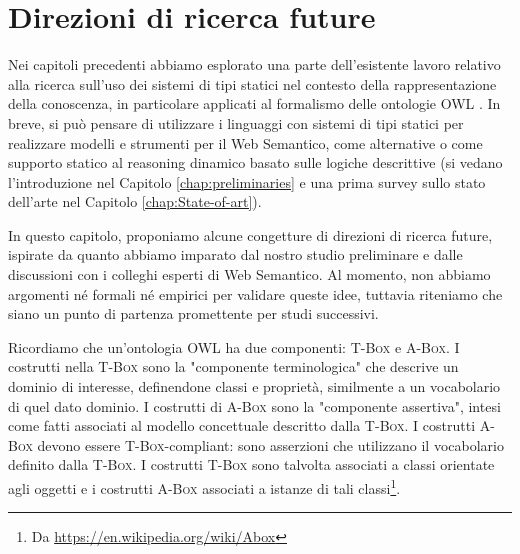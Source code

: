 
\chapter[Direzioni di ricerca future]{Direzioni di ricerca future}
\label{chap:FutureWork}

Nei capitoli precedenti abbiamo esplorato una parte dell'esistente lavoro relativo alla ricerca sull'uso dei sistemi di tipi statici nel contesto della 
rappresentazione della conoscenza, in particolare applicati al formalismo delle ontologie OWL \cite{OWL}. In breve, si può pensare di utilizzare i 
linguaggi con sistemi di tipi statici per realizzare modelli e strumenti per  il Web Semantico, come alternative o come supporto statico al reasoning 
dinamico basato sulle logiche descrittive (si vedano l'introduzione nel Capitolo \ref{chap:preliminaries} e una prima survey sullo stato dell'arte nel Capitolo \ref{chap:State-of-art}).

In questo capitolo, proponiamo alcune congetture di direzioni di ricerca future, ispirate da quanto abbiamo imparato dal nostro studio preliminare e dalle 
discussioni con i colleghi esperti di Web Semantico. Al momento, non abbiamo argomenti né formali né empirici per validare queste idee, tuttavia riteniamo 
che siano un punto di partenza promettente per studi successivi.

Ricordiamo che un'ontologia OWL ha due componenti: \textsc{T-Box} e \textsc{A-Box}. I costrutti nella \textsc{T-Box} sono la "componente terminologica" che descrive un dominio di 
interesse, definendone classi e proprietà, similmente a un vocabolario di quel dato dominio. I costrutti di \textsc{A-Box} sono la "componente assertiva", 
intesi come fatti associati al modello concettuale descritto dalla \textsc{T-Box}. I costrutti \textsc{A-Box} devono essere \textsc{T-Box}-compliant: sono asserzioni che utilizzano il 
vocabolario definito dalla \textsc{T-Box}. I costrutti \textsc{T-Box} sono talvolta associati a classi orientate agli oggetti e i costrutti \textsc{A-Box} associati a istanze di tali 
classi\footnote{Da \url{https://en.wikipedia.org/wiki/Abox}}.

